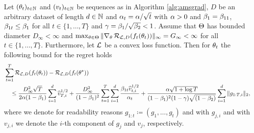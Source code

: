 \begin{theorem}\label{theorem:amsgrad}
Let $(\theta_t)_{t\in\operatorname{\mathbb{N}}}$ and $(v_t)_{t\in\operatorname{\mathbb{N}}}$ be sequences as in Algorithm \ref{alg:amsgrad}, $D$ be an arbitrary dataset of length $d\in\operatorname{\mathbb{N}}$ and $\alpha_t = \alpha/\sqrt{t}$ with $\alpha>0$ and $\beta_1 = \beta_{11}$, $\beta_{1t}\leq \beta_1$ for all $t \in \{1,\ldots, T\}$ and $\operatorname{\gamma} = \beta_1/\sqrt{\beta_{2}} < 1$. Assume that $\operatorname{\Theta}$ has bounded diameter $D_{\infty}<\infty$ and $\max_{\theta\in\operatorname{\Theta}}\|\nabla_{\theta}\operatorname{\mathcal{R}}_{\operatorname{\mathcal{L}}, D}(f_t(\theta_t))\|_{\infty}= G_{\infty}<\infty$ for all $t \in \{1,\ldots, T\}$. Furthermore, let $\operatorname{\mathcal{L}}$ be a convex loss function. Then for $\theta_t$ the following bound for the regret holds
\begin{align*}
&\sum_{t=1}^T \operatorname{\mathcal{R}}_{\operatorname{\mathcal{L}}, D}(f_t(\theta_t)) - \operatorname{\mathcal{R}}_{\operatorname{\mathcal{L}}, D}(f_t(\theta^{\ast}))\\
&\quad\leq \frac{D_{\infty}^2\sqrt{T}}{2\alpha(1-\beta_1)} \sum_{i=1}^d \widehat{v}_{T,i}^{1/2} + \frac{D_{\infty}^2}{(1-\beta_1)^2} \sum_{t=1}^T \sum_{i=1}^d \frac{\beta_{1t}\widehat{v}_{t,i}^{1/2}}{\alpha_t}+ \frac{\alpha\sqrt{1 + \log T}}{(1-\beta_1)^2(1-\operatorname{\gamma})\sqrt{(1-\beta_2)}}\sum_{i=1}^d \|g_{1:T,i}\|_2,
\end{align*}
where we denote for readability reasons $g_{1:t}\coloneqq(g_1,\ldots, g_t)$ and with $g_{j,i}$ and with $v_{j,i}$ we denote the $i$-th component of $g_j$ and $v_j$, respectively.
\end{theorem}

